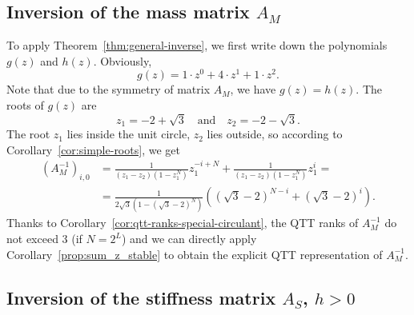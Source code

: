 \documentclass[a4paper]{article}
\newcommand{\LL}{L}
\newcommand{\mass}{A_M}
\newcommand{\lap}{A_S}
\newcommand{\base}{2}
\begin{document}
\subsection{Inversion of the mass matrix $\mass$} 


    To apply Theorem~\ref{thm:general-inverse}, we first write down the polynomials $g(z)$ and $h(z)$.
    Obviously, \[g(z) = 1\cdot z^0 + 4 \cdot z^1 + 1 \cdot z^2.\]
    Note that due to the symmetry of matrix $\mass$, we have $g(z) = h(z)$.
    The roots of $g(z)$ are 
    \[z_{1} = -2+\sqrt{3} \quad \text{and}\quad z_{2} = -2- \sqrt{3}.\]
    The root $z_1$  lies inside the unit circle, $z_2$ lies outside, so according to Corollary~\ref{cor:simple-roots}, we get
    \begin{align*}
    (\mass^{-1})_{i,0} 
    &=
    \frac{1}{(z_1-z_2)(1-z_1^N)}z_1^{-i+N}
    +
    \frac{1}{(z_1-z_2)(1-z_1^N)}z_1^{i}
    = \\ &=
    \frac{1}{2\sqrt{3}(1-(\sqrt{3}-2)^N)}
    \left(
    (\sqrt{3}-2)^{N-i} + (\sqrt{3}-2)^{i}
    \right).
    \end{align*}
    Thanks to Corollary~\ref{cor:qtt-ranks-special-circulant}, the QTT ranks of $\mass^{-1}$ do not exceed $3$ (if $N = \base^\LL$) and we can directly apply Corollary~\ref{prop:sum_z_stable} to obtain the explicit QTT representation of $\mass^{-1}$.
    
    
\subsection{Inversion of the stiffness matrix $\lap$, $h>0$} 
    
\end{document}
